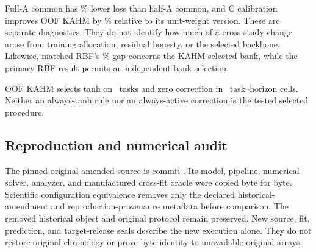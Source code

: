 Full-A common has \CFRFullCommonGain\% lower loss than half-A common,
and C calibration improves OOF KAHM by \CFRCalibrationGain\% relative
to its unit-weight version. These are separate diagnostics. They do not
identify how much of a cross-study change arose from training allocation,
residual honesty, or the selected backbone. Likewise, matched RBF's
\CFRMatchedRBFGain\% gap concerns the KAHM-selected bank, while the
primary RBF result permits an independent bank selection.

\begin{table}[t]
\centering\small
\caption{B-selected caps and history scalers, over all \CFRTasks\ tasks
including the linear control. Cap counts and scaler counts each sum to
\CFRTasks\ within a row. These frequencies describe the fitted selection
procedure; they are not estimates of a causal scaler or dimension effect.}
\label{tab:supp-cfr-selections}

\end{table}

\begin{table}[t]
\centering\small
\caption{C multipliers across \CFRCalibrationCells\ task--horizon
choices per correction. Zero returns the identical common-plus-bias
baseline. Repeated horizons and tasks within a repetition are dependent.}
\label{tab:supp-cfr-calibration}

\end{table}

OOF KAHM selects tanh on \CFRKAHMTanhSelections\ tasks and zero
correction in \CFRKAHMEtaZero\ task--horizon cells. Neither an always-tanh
rule nor an always-active correction is the tested selected procedure.

\subsection{Reproduction and numerical audit}

The pinned original amended source is commit
. Its model, pipeline,
numerical solver, analyzer, and manufactured cross-fit oracle were copied
byte for byte. Scientific configuration equivalence removes only the
declared historical-amendment and reproduction-provenance metadata before
comparison. The removed historical object and original protocol remain
preserved. New source, fit, prediction, and target-release seals describe
the new execution alone. They do not restore original chronology or prove
byte identity to unavailable original arrays.

